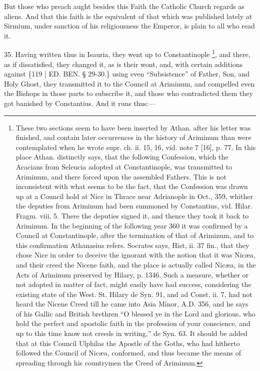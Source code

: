 But those who preach aught
besides this Faith the Catholic Church regards as aliens. And that
this faith is the equivalent of that which was published lately at
Sirmium, under sanction of his religiousness the Emperor, is plain to
all who read it.

35. Having written thus in
Isauria, they went up to Constantinople \footnote{These two sections seem to have been inserted by Athan. after his
letter was finished, and contain later occurrences in the history of
Ariminum than were contemplated when he wrote supr. ch. ii. 15, 16,
vid. note 7 [16], p. 77. In this place Athan. distinctly says, that the
following Confession, which the Acacians from Seleucia adopted at
Constantinople, was transmitted to Ariminum, and there forced upon the
assembled Fathers. This is not inconsistent with what seems to be the
fact, that the Confession was drawn up at a Council hold at Nice in
Thrace near Adrianople in Oct., 359, whither the deputies from
Ariminum had been summoned by Constantius, vid. Hilar. Fragm. viii. 5.
There the deputies signed it, and thence they took it back to Ariminum.
In the beginning of the following year 360 it was confirmed by a
Council at Constantinople, after the termination of that of Ariminum,
and to this confirmation Athanasius refers. Socrates says, Hist, ii.
37 fin., that they chose Nice in order to deceive the ignorant with
the notion that it was Nicæa, and their creed the Nicene faith, and
the place is actually called Nicæa, in the Acts of Ariminum preserved
by Hilary, p. 1346. Such a measure, whether or not adopted in matter
of fact, might easily have had success, considering the existing state
of the West. St. Hilary de Syn. 91, and ad Const. ii. 7, had not heard
the Nicene Creed till he came into Asia Minor, A.D.
356, and he says of his Gallic and British brethren ``O blessed ye in
the Lord and glorious, who hold the perfect and apostolic faith in the
profession of your conscience, and up to this time know not creeds in
writing,'' de Syn. 63. It should be added that at this Council Ulphilas
the Apostle of the Goths, who had hitherto followed the Council of Nicæa,
conformed, and thus became the means of spreading through his
countrymen the Creed of Ariminum.}, and there, as if dissatisfied, they changed it, as is their
wont, and, with certain additions against \{119 | ED.
BEN. § 29-30.\} using even ``Subsistence'' of
Father, Son, and Holy Ghost, they transmitted it to the Council at
Ariminum, and compelled even the Bishops in those parts to subscribe
it, and those who contradicted them they got banished by Constantius.
And it runs thus:—

